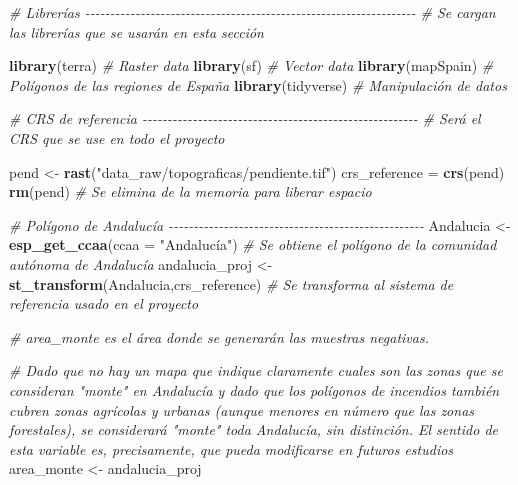\documentclass[12pt,a4paper,]{book}
\newenvironment{Shaded}{\begin{snugshade}}{\end{snugshade}}
\newcommand{\AttributeTok}[1]{\textcolor[rgb]{0.13,0.29,0.53}{#1}}
\newcommand{\CommentTok}[1]{\textcolor[rgb]{0.56,0.35,0.01}{\textit{#1}}}
\newcommand{\FunctionTok}[1]{\textcolor[rgb]{0.13,0.29,0.53}{\textbf{#1}}}
\newcommand{\NormalTok}[1]{#1}
\newcommand{\OtherTok}[1]{\textcolor[rgb]{0.56,0.35,0.01}{#1}}
\newcommand{\StringTok}[1]{\textcolor[rgb]{0.31,0.60,0.02}{#1}}
\numberwithin{dummy}{section}
\theoremstyle{ocrenumbox}
\theoremstyle{blacknumex}
\theoremstyle{blacknumbox}
\theoremstyle{ocrenum}
\theoremstyle{ocrenum}
\begin{document}
\begin{Shaded}
\begin{Highlighting}[]
\CommentTok{\# Librerías {-}{-}{-}{-}{-}{-}{-}{-}{-}{-}{-}{-}{-}{-}{-}{-}{-}{-}{-}{-}{-}{-}{-}{-}{-}{-}{-}{-}{-}{-}{-}{-}{-}{-}{-}{-}{-}{-}{-}{-}{-}{-}{-}{-}{-}{-}{-}{-}{-}{-}{-}{-}{-}{-}{-}{-}{-}{-}{-}{-}{-}{-}{-}{-}{-}{-}  }
\CommentTok{\# Se cargan las librerías que se usarán en esta sección}

\FunctionTok{library}\NormalTok{(terra) }\CommentTok{\# Raster data}
\FunctionTok{library}\NormalTok{(sf) }\CommentTok{\# Vector data}
\FunctionTok{library}\NormalTok{(mapSpain) }\CommentTok{\# Polígonos de las regiones de España}
\FunctionTok{library}\NormalTok{(tidyverse) }\CommentTok{\# Manipulación de datos}



\CommentTok{\# CRS de referencia {-}{-}{-}{-}{-}{-}{-}{-}{-}{-}{-}{-}{-}{-}{-}{-}{-}{-}{-}{-}{-}{-}{-}{-}{-}{-}{-}{-}{-}{-}{-}{-}{-}{-}{-}{-}{-}{-}{-}{-}{-}{-}{-}{-}{-}{-}{-}{-}{-}{-}{-}{-}{-}{-}{-}}
\CommentTok{\# Será el CRS que se use en todo el proyecto}

\NormalTok{pend }\OtherTok{\textless{}{-}} \FunctionTok{rast}\NormalTok{(}\StringTok{"data\_raw/topograficas/pendiente.tif"}\NormalTok{)}
\NormalTok{crs\_reference }\OtherTok{=} \FunctionTok{crs}\NormalTok{(pend)}
\FunctionTok{rm}\NormalTok{(pend) }\CommentTok{\# Se elimina de la memoria para liberar espacio}


\CommentTok{\# Polígono de Andalucía {-}{-}{-}{-}{-}{-}{-}{-}{-}{-}{-}{-}{-}{-}{-}{-}{-}{-}{-}{-}{-}{-}{-}{-}{-}{-}{-}{-}{-}{-}{-}{-}{-}{-}{-}{-}{-}{-}{-}{-}{-}{-}{-}{-}{-}{-}{-}{-}{-}{-}{-}}
\NormalTok{Andalucia }\OtherTok{\textless{}{-}} \FunctionTok{esp\_get\_ccaa}\NormalTok{(}\AttributeTok{ccaa =} \StringTok{"Andalucía"}\NormalTok{) }\CommentTok{\# Se obtiene el polígono de la comunidad autónoma de Andalucía}
\NormalTok{andalucia\_proj }\OtherTok{\textless{}{-}} \FunctionTok{st\_transform}\NormalTok{(Andalucia,crs\_reference) }\CommentTok{\# Se transforma al sistema de referencia usado en el proyecto}

\CommentTok{\# area\_monte es el área donde se generarán las muestras negativas.}

\CommentTok{\# Dado que no hay un mapa que indique claramente cuales son las zonas que se consideran "monte" en Andalucía y dado que los polígonos de incendios también cubren zonas agrícolas y urbanas (aunque menores en número que las zonas forestales), se considerará "monte" toda Andalucía, sin distinción. El sentido de esta variable es, precisamente, que pueda modificarse en futuros estudios}
\NormalTok{area\_monte }\OtherTok{\textless{}{-}}\NormalTok{ andalucia\_proj}


\end{Highlighting}
\end{Shaded}
\end{document}
